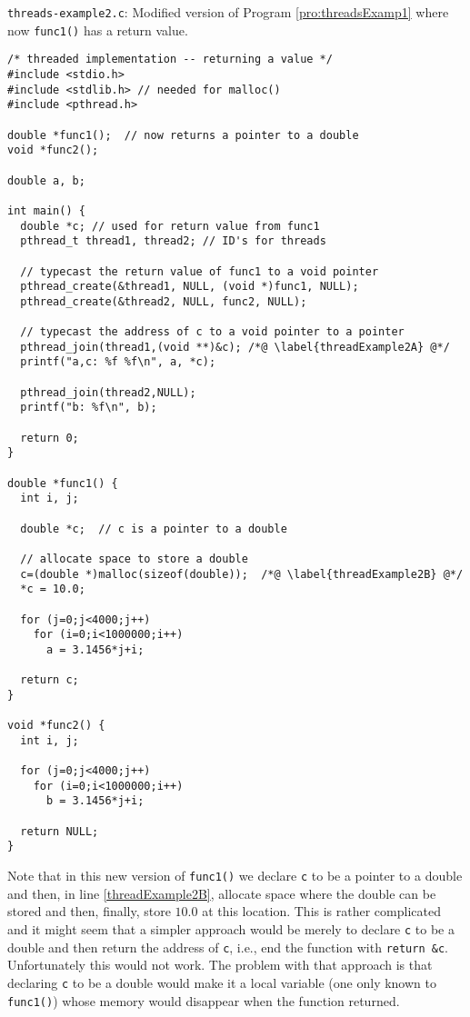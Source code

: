 \begin{program}
{\tt threads-example2.c}: Modified version of Program
\ref{pro:threadsExamp1} where now {\tt func1()} has a return value.
 \label{pro:threadsExamp2}
\codemiddle
\begin{lstlisting}
/* threaded implementation -- returning a value */
#include <stdio.h>
#include <stdlib.h> // needed for malloc()
#include <pthread.h>

double *func1();  // now returns a pointer to a double
void *func2();

double a, b;

int main() {
  double *c; // used for return value from func1
  pthread_t thread1, thread2; // ID's for threads

  // typecast the return value of func1 to a void pointer
  pthread_create(&thread1, NULL, (void *)func1, NULL);
  pthread_create(&thread2, NULL, func2, NULL);

  // typecast the address of c to a void pointer to a pointer
  pthread_join(thread1,(void **)&c); /*@ \label{threadExample2A} @*/
  printf("a,c: %f %f\n", a, *c);

  pthread_join(thread2,NULL);
  printf("b: %f\n", b);

  return 0;
}

double *func1() {
  int i, j;

  double *c;  // c is a pointer to a double

  // allocate space to store a double
  c=(double *)malloc(sizeof(double));  /*@ \label{threadExample2B} @*/
  *c = 10.0;

  for (j=0;j<4000;j++)
    for (i=0;i<1000000;i++)
      a = 3.1456*j+i;

  return c;
}
  
void *func2() {
  int i, j;

  for (j=0;j<4000;j++)
    for (i=0;i<1000000;i++)
      b = 3.1456*j+i;

  return NULL;
}
\end{lstlisting}
\end{program}

Note that in this new version of {\tt func1()} we declare {\tt c} to
be a pointer to a double and then, in line \ref{threadExample2B},
allocate space where the double can be stored and then, finally, store
$10.0$ at this location.  This is rather complicated and it might seem
that a simpler approach would be merely to declare {\tt c} to be a
double and then return the address of {\tt c}, i.e., end the function
with {\tt return \&c}.  Unfortunately this would not work.  The
problem with that approach is that declaring {\tt c} to be a double
would make it a local variable (one only known to {\tt func1()}) whose
memory would disappear when the function returned.

